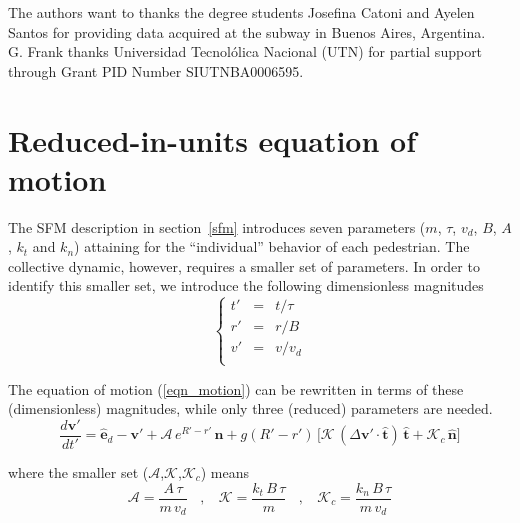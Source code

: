 \documentclass[preprint,12pt]{elsarticle}
\begin{document}
The authors want to thanks the degree students Josefina Catoni and Ayelen Santos for providing data acquired at 
the subway in Buenos Aires, Argentina. \\

G. Frank thanks Universidad Tecnol\'olica Nacional (UTN) for partial
support through Grant PID Number SIUTNBA0006595.

\appendix

\section{\label{appendix1}Reduced-in-units equation of motion}

The SFM description in section~\ref{sfm} introduces seven parameters ($m$, 
$\tau$, $v_d$, $B$, $A$, $k_t$ and $k_n$) attaining for the ``individual'' 
behavior of each pedestrian. The collective dynamic, however, requires a 
smaller set of parameters. In order to identify this smaller set, we introduce 
the following dimensionless magnitudes\\

\begin{equation}
 \left\{\begin{array}{lcl}
         t' & = & t/\tau \\
         r' & = & r/B \\
         v' & = & v/v_d \\
        \end{array}\right.
\end{equation}

The equation of motion (\ref{eqn_motion}) can be rewritten in terms of these 
(dimensionless) magnitudes, while only three (reduced) parameters are needed.\\


\begin{equation}
 \displaystyle\frac{d\mathbf{v}'}{dt'}=
 \hat{\mathbf{e}}_d-\mathbf{v}'+\mathcal{A}\,e^{R'-r'}\,
 \hat{\mathbf{n}}+g(R'-r')\,\bigg[\mathcal{K}\,(\Delta\mathbf{v}'\cdot
 \hat{\mathbf{t}})\,\hat{\mathbf{t}}+\mathcal{K}_c\,\hat{\mathbf{n}}\bigg]
\end{equation}



\noindent where the smaller set ($\mathcal{A}$,$\mathcal{K}$,$\mathcal{K}_c$) 
means\\

\begin{equation}
 \mathcal{A}=\displaystyle\frac{A\,\tau}{m\,v_d}\ \ \ \ , \ \ \ \ 
 \mathcal{K}=\displaystyle\frac{k_t\,B\,\tau}{m}\ \ \ \ , \ \ \ \
 \mathcal{K}_c=\displaystyle\frac{k_n\,B\,\tau}{m\,v_d}
\end{equation}
\end{document}
